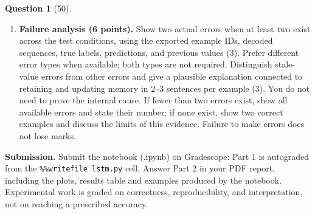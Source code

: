 \documentclass[12pt]{article}
\theoremstyle{definition}
\newtheorem{exercise}{Question}%
\begin{document}
\begin{exercise}[50]
{\begin{enumerate}
\item \textbf{Failure analysis (6 points).} Show two actual errors when at least two exist
across the test conditions, using the exported example IDs, decoded
sequences, true labels, predictions, and previous values (3). Prefer different error types when available; both types are not required.
Distinguish stale-value errors from other errors and give a plausible
explanation connected to retaining and updating memory in 2--3 sentences per example (3). You do not need to prove the internal cause.
If fewer than two errors exist, show all available errors and state their
number; if none exist, show two correct examples and discuss the limits of
this evidence. Failure to make errors does not lose marks.
\end{enumerate}

\textbf{Submission.} Submit the notebook (.ipynb) on Gradescope: Part 1 is autograded from the
\texttt{\%\%writefile lstm.py} cell. Answer Part 2 in your PDF report, including the plots, results table and
examples produced by the notebook.
Experimental work is graded on correctness, reproducibility, and
interpretation, not on reaching a prescribed accuracy.
}
\end{exercise}
\end{document}
